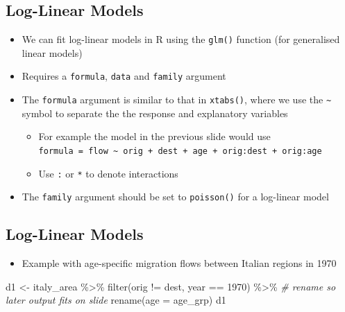 \documentclass[
]{book}
\newenvironment{Shaded}{\begin{snugshade}}{\end{snugshade}}
\newcommand{\AttributeTok}[1]{\textcolor[rgb]{0.77,0.63,0.00}{#1}}
\newcommand{\CommentTok}[1]{\textcolor[rgb]{0.56,0.35,0.01}{\textit{#1}}}
\newcommand{\DecValTok}[1]{\textcolor[rgb]{0.00,0.00,0.81}{#1}}
\newcommand{\FunctionTok}[1]{\textcolor[rgb]{0.00,0.00,0.00}{#1}}
\newcommand{\NormalTok}[1]{#1}
\newcommand{\OtherTok}[1]{\textcolor[rgb]{0.56,0.35,0.01}{#1}}
\newcommand{\SpecialCharTok}[1]{\textcolor[rgb]{0.00,0.00,0.00}{#1}}
\providecommand{\tightlist}{%
  \setlength{\itemsep}{0pt}\setlength{\parskip}{0pt}}
\begin{document}
\hypertarget{log-linear-models-2}{%
\subsection{Log-Linear Models}\label{log-linear-models-2}}

\begin{itemize}
\tightlist
\item
  We can fit log-linear models in R using the \texttt{glm()} function (for generalised linear models)
\item
  Requires a \texttt{formula}, \texttt{data} and \texttt{family} argument
\item
  The \texttt{formula} argument is similar to that in \texttt{xtabs()}, where we use the \texttt{\textasciitilde{}} symbol to separate the the response and explanatory variables

  \begin{itemize}
  \tightlist
  \item
    For example the model in the previous slide would use \texttt{formula\ =\ flow\ \textasciitilde{}\ orig\ +\ dest\ +\ age\ +\ orig:dest\ +\ orig:age}
  \item
    Use \texttt{:} or \texttt{*} to denote interactions
  \end{itemize}
\item
  The \texttt{family} argument should be set to \texttt{poisson()} for a log-linear model
\end{itemize}

\hypertarget{log-linear-models-3}{%
\subsection{Log-Linear Models}\label{log-linear-models-3}}

\begin{itemize}
\tightlist
\item
  Example with age-specific migration flows between Italian regions in 1970
\end{itemize}

\begin{Shaded}
\begin{Highlighting}[]
\NormalTok{d1 }\OtherTok{\textless{}{-}}\NormalTok{ italy\_area }\SpecialCharTok{\%\textgreater{}\%}
  \FunctionTok{filter}\NormalTok{(orig }\SpecialCharTok{!=}\NormalTok{ dest, }
\NormalTok{         year }\SpecialCharTok{==} \DecValTok{1970}\NormalTok{) }\SpecialCharTok{\%\textgreater{}\%}
  \CommentTok{\# rename so later output fits on slide}
  \FunctionTok{rename}\NormalTok{(}\AttributeTok{age =}\NormalTok{ age\_grp)}
\NormalTok{d1}
\end{Highlighting}
\end{Shaded}
\end{document}
